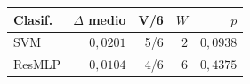 \begin{resulttable}
\centering\fontsize{8}{10}\selectfont\setlength{\tabcolsep}{3.0pt}
\caption{Sensibilidad: Completa menos Individual mediante Wilcoxon exacto bilateral sobre seis datasets. V indica datasets con diferencia positiva y $W$ la menor suma de rangos.}
\label{tab:classifier-sensitivity}
\begin{tabular}{@{}lrrrr@{}}
\toprule
Clasif. & $\Delta$ medio & V/6 & $W$ & $p$ \\
\midrule
SVM & $0{,}0201$ & 5/6 & $2$ & $0{,}0938$ \\
ResMLP & $0{,}0104$ & 4/6 & $6$ & $0{,}4375$ \\
\bottomrule
\end{tabular}
\end{resulttable}
\FloatBarrier
